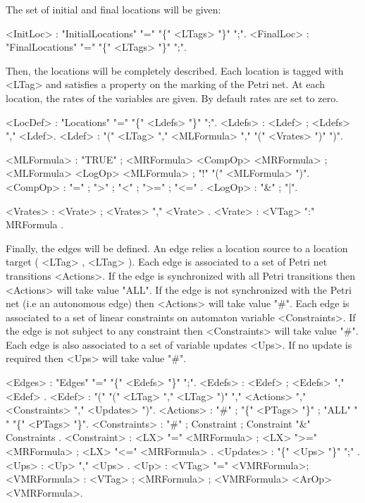 \documentclass[a4paper]{article}
\begin{document}
The set of initial and final locations will be given:
\begin{grammar}
[(colon){$::=$ }]
[(semicolon){$|$ }]
[(period){\\ }]
[(quote){"}{" }]
[(nonterminal){$\langle$}{$\rangle$ }]
<InitLoc> : "InitialLocations" "=" "\{" <LTags> "\}" ";".
<FinalLoc> : "FinalLocations" "=" "\{" <LTags> "\}" ";".
\end{grammar}

Then, the locations will be completely described. Each location is tagged with <LTag> and satisfies  a property on the  marking of the Petri net.
At each location, the rates of the variables are given. By default rates are set to zero.
\begin{grammar}
[(colon){$::=$ }]
[(semicolon){$|$ }]
[(period){\\ }]
[(quote){"}{" }]
[(nonterminal){$\langle$}{$\rangle$ }]
<LocDef> : "Locations" "=" "\{" <Ldefs> "\}" ";".
<Ldefs> :  <Ldef> ; <Ldefs> "," <Ldef>.
<Ldef> : "(" <LTag> "," <MLFormula> "," "(" <Vrates> ")" ")".

<MLFormula> : "TRUE" ; <MRFormula> <CompOp>  <MRFormula> ; <MLFormula> <LogOp> <MLFormula> ; "!" "(" <MLFormula> ")".
<CompOp> : "=" ; ">" ; "<" ; ">=" ; "<=" .
<LogOp> : "\&" ; "|".

<Vrates> : <Vrate> ; <Vrates> "," <Vrate> .
<Vrate> : <VTag> ":" MRFormula .
\end{grammar}


Finally, the edges will be defined. An edge relies a location source to a location target ( <LTag> , <LTag> ). 
Each edge is associated to a set of Petri net transitions <Actions>. If the edge is synchronized with all Petri transitions then
<Actions> will take value "ALL". If the edge is not synchronized with the Petri net (i.e an autonomous edge) then <Actions> will take 
value "\#". Each edge is associated to a set of linear constraints on automaton variable <Constraints>. If the edge is not subject  to any 
constraint then <Constraints> will take value "\#". Each edge is also associated to a set of variable updates <Ups>. If no update is required then 
<Ups> will take value "\#". 
\begin{grammar}
[(colon){$::=$ }]
[(semicolon){$|$ }]
[(period){\\ }]
[(quote){"}{" }]
[(nonterminal){$\langle$}{$\rangle$ }]
<Edges> : "Edges" "=" "\{" <Edefs> "\}" ";".
<Edefs> : <Edef> ; <Edefs> "," <Edef> .
<Edef> : "(" "(" <LTag> "," <LTag> ")" "," <Actions> "," <Constraints> "," <Updates> ")".
<Actions> : "\#" ; "\{" <PTags> "\}" ; "ALL" "\\" "\{" <PTags> "\}".
<Constraints> : "\#" ; Constraint ; Constraint "\&" Constraints .
<Constraint> : <LX> "=" <MRFormula> ; <LX> ">=" <MRFormula> ; <LX> "<=" <MRFormula> .
<Updates> : "\{" <Ups> "\}" ";" .
<Ups> : <Up> "," <Ups> .
<Up> : <VTag> "=" <VMRFormula>;
<VMRFormula> : <VTag> ; <MRFormula> ; <VMRFormula> <ArOp> <VMRFormula>.
\end{grammar}
\end{document}
